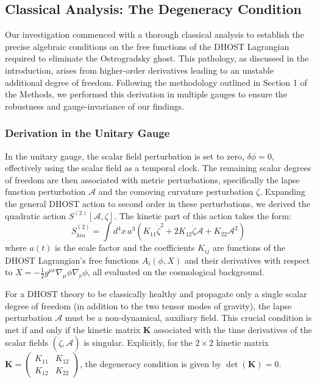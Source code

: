 \documentclass[twocolumn]{aastex631}
\begin{document}
\subsection{Classical Analysis: The Degeneracy Condition}

Our investigation commenced with a thorough classical analysis to establish the precise algebraic conditions on the free functions of the DHOST Lagrangian required to eliminate the Ostrogradsky ghost. This pathology, as discussed in the introduction, arises from higher-order derivatives leading to an unstable additional degree of freedom. Following the methodology outlined in Section 1 of the Methods, we performed this derivation in multiple gauges to ensure the robustness and gauge-invariance of our findings.

\subsubsection{Derivation in the Unitary Gauge}
In the unitary gauge, the scalar field perturbation is set to zero, $\delta\phi=0$, effectively using the scalar field as a temporal clock. The remaining scalar degrees of freedom are then associated with metric perturbations, specifically the lapse function perturbation $\mathcal{A}$ and the comoving curvature perturbation $\zeta$. Expanding the general DHOST action to second order in these perturbations, we derived the quadratic action $S^{(2)}[\mathcal{A}, \zeta]$. The kinetic part of this action takes the form:
\begin{equation}
S^{(2)}_{kin} = \int d^4x \, a^3 \left( K_{11} \dot{\zeta}^2 + 2 K_{12} \dot{\zeta} \mathcal{A} + K_{22} \mathcal{A}^2 \right)
\end{equation}
where $a(t)$ is the scale factor and the coefficients $K_{ij}$ are functions of the DHOST Lagrangian's free functions $A_i(\phi, X)$ and their derivatives with respect to $X = -\frac{1}{2} g^{\mu\nu} \nabla_\mu\phi \nabla_\nu\phi$, all evaluated on the cosmological background.

For a DHOST theory to be classically healthy and propagate only a single scalar degree of freedom (in addition to the two tensor modes of gravity), the lapse perturbation $\mathcal{A}$ must be a non-dynamical, auxiliary field. This crucial condition is met if and only if the kinetic matrix $\mathbf{K}$ associated with the time derivatives of the scalar fields $(\dot{\zeta}, \mathcal{A})$ is singular. Explicitly, for the $2 \times 2$ kinetic matrix $\mathbf{K} = \begin{pmatrix} K_{11} & K_{12} \\ K_{12} & K_{22} \end{pmatrix}$, the degeneracy condition is given by $\det(\mathbf{K}) = 0$.
\end{document}
